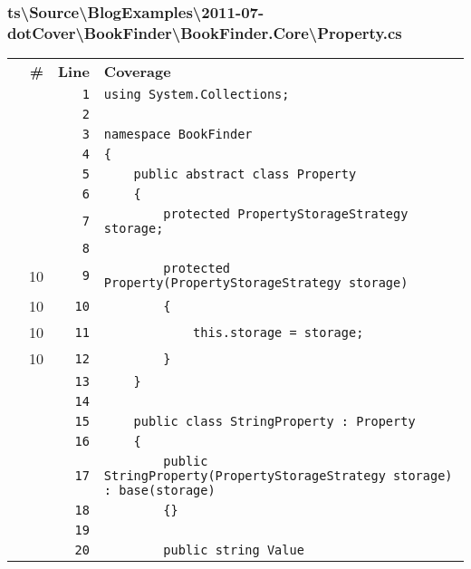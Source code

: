 \documentclass[a4paper,10pt]{article}
\begin{document}
\subsubsection{ts\textbackslash Source\textbackslash BlogExamples\textbackslash 2011-07-dotCover\textbackslash BookFinder\textbackslash BookFinder.Core\textbackslash Property.cs}
\begin{longtable}[l]{lrrl}
\textbf{} & \textbf{\#} & \textbf{Line} & \textbf{Coverage}\\
\cellcolor{gray} &  & \verb~1~ & \verb~using System.Collections;~\\
\cellcolor{gray} &  & \verb~2~ & \verb~~\\
\cellcolor{gray} &  & \verb~3~ & \verb~namespace BookFinder~\\
\cellcolor{gray} &  & \verb~4~ & \verb~{~\\
\cellcolor{gray} &  & \verb~5~ & \verb~    public abstract class Property~\\
\cellcolor{gray} &  & \verb~6~ & \verb~    {~\\
\cellcolor{gray} &  & \verb~7~ & \verb~        protected PropertyStorageStrategy storage;~\\
\cellcolor{gray} &  & \verb~8~ & \verb~~\\
\cellcolor{green} & 10 & \verb~9~ & \verb~        protected Property(PropertyStorageStrategy storage)~\\
\cellcolor{green} & 10 & \verb~10~ & \verb~        {~\\
\cellcolor{green} & 10 & \verb~11~ & \verb~            this.storage = storage;~\\
\cellcolor{green} & 10 & \verb~12~ & \verb~        }~\\
\cellcolor{gray} &  & \verb~13~ & \verb~    }~\\
\cellcolor{gray} &  & \verb~14~ & \verb~~\\
\cellcolor{gray} &  & \verb~15~ & \verb~    public class StringProperty : Property~\\
\cellcolor{gray} &  & \verb~16~ & \verb~    {~\\
\cellcolor{gray} &  & \verb~17~ & \verb~        public StringProperty(PropertyStorageStrategy storage) : base(storage)~\\
\cellcolor{gray} &  & \verb~18~ & \verb~        {}~\\
\cellcolor{gray} &  & \verb~19~ & \verb~~\\
\cellcolor{gray} &  & \verb~20~ & \verb~        public string Value~\\

\end{longtable}
\end{document}
